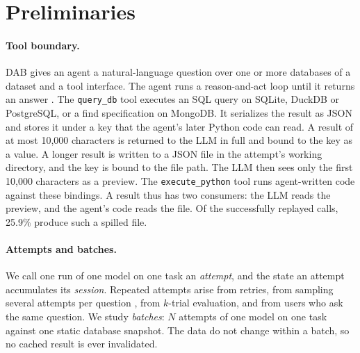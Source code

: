 \section{Preliminaries}
\label{sec:background}



\paragraph{Tool boundary.}
DAB gives an agent a natural-language question over one or more databases of a dataset and a tool interface. The agent
runs a reason-and-act loop \cite{yao2023react} until it returns an answer \cite{ma2026dab}. The \texttt{query\_db}
tool executes an SQL query on SQLite, DuckDB or PostgreSQL, or a find specification on MongoDB. It serializes the
result as JSON and stores it under a key that the agent's later Python code can read. A result of at most 10,000
characters is returned to the LLM in full and bound to the key as a value. A longer result is written to a JSON file
in the attempt's working directory, and the key is bound to the file path. The LLM then sees only the first 10,000
characters as a preview. The \texttt{execute\_python} tool runs agent-written code against these bindings. A result
thus has two consumers: the LLM reads the preview, and the agent's code reads the file. Of the successfully replayed
calls, 25.9\% produce such a spilled file.

\paragraph{Attempts and batches.}
We call one run of one model on one task an \emph{attempt}, and the state an attempt accumulates its \emph{session}.
Repeated attempts arise from retries, from sampling several attempts per question
\cite{wang2023selfconsistency,brown2024monkeys}, from $k$-trial evaluation, and from users who ask the same question.
We study \emph{batches}: $N$ attempts of one model on one task against one static database snapshot.  The data do not change within a batch, so no cached result is ever invalidated.

